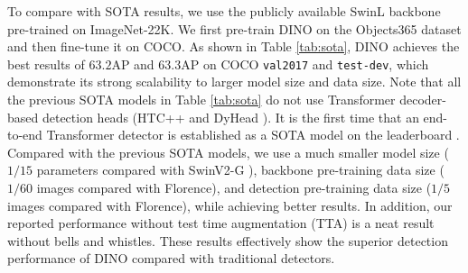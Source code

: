 \documentclass[runningheads]{llncs}
\begin{document}
To compare with SOTA results, we use the publicly available SwinL \cite{liu2021swin} backbone pre-trained on ImageNet-22K. We first pre-train DINO on the Objects365 \cite{shao2019objects365} dataset and then fine-tune it on COCO. As shown in Table \ref{tab:sota}, DINO achieves the best results of $63.2$AP and $63.3$AP on COCO \texttt{val2017} and \texttt{test-dev}, which demonstrate its strong scalability to larger model size and data size. Note that all the previous SOTA models in Table \ref{tab:sota} do not use Transformer decoder-based detection heads (HTC++ \cite{chen2019hybrid} and DyHead \cite{dai2021dynamic}). It is the first time that an end-to-end Transformer detector is established as a SOTA model on the leaderboard \cite{paperwithcode}. Compared with the previous SOTA models, we use a much smaller model size ($1/15$ parameters compared with SwinV2-G \cite{liu2021swinv2}), backbone pre-training data size ($1/60$ images compared with Florence), and detection pre-training data size ($1/5$ images compared with Florence), while achieving better results. In addition, our reported performance without test time augmentation (TTA) is a neat result without bells and whistles. These results effectively show the superior detection performance of DINO compared with traditional detectors.
\end{document}
